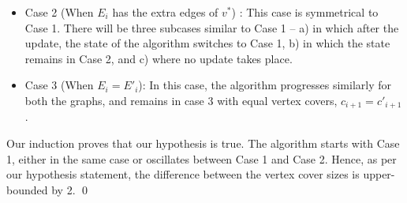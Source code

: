 {\begin{itemize}
\begin{enumerate}[label=\alph*),ref=\alph*]
            Also, the edges adjacent to $u$ and $v$ will be removed from $E_i$ and $E'_i$. We still have $E'_i = E + {v^*}$ (the extra edges of $v^*$ and remain in case 1 for step i+1. 

            \item If the edge is part of neither $E'_i$ nor $E_i$ (If $e_{i+1} \in E'_i$ and $e_{i+1} \in E_i$): the algorithm makes no change. The previous state keep constant: $E'_{i+1} = E'_i, E_{i+1} = E_i$ and $c'_{i+1} = c'_i, c_{i+1} = c_i$. The extra edges of $v^*$ are still in $E'_{i+1}$.
        \end{enumerate}
        
    \item Case 2 (When $E_i$ has the extra edges of $v^*$) : This case is symmetrical to Case 1. There will be three subcases similar to Case 1 -- a) in which after the update, the state of the algorithm switches to Case 1, b) in which the state remains in Case 2, and c) where no update takes place.  

    \item Case 3 (When $E_i = E'_i$): In this case, the algorithm progresses similarly for both the graphs, and remains in case 3 with equal vertex covers, $c_{i+1} = c'_{i+1}$.
\end{itemize}

Our induction proves that our hypothesis is true. The algorithm starts with Case 1, either in the same case or oscillates between Case 1 and Case 2. Hence, as per our hypothesis statement, the difference between the vertex cover sizes is upper-bounded by 2.
\qed
}
\fi



